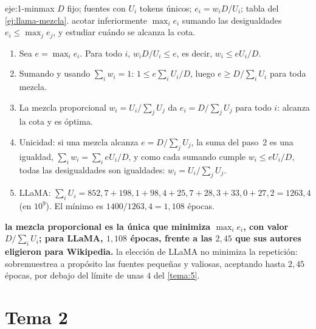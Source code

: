 \begin{solucion}{eje:1-minmax}
\datos $D$ fijo; fuentes con $U_i$ tokens únicos; $e_i=w_iD/U_i$; tabla del \cref{ej:llama-mezcla}.
\planteamiento acotar inferiormente $\max_ie_i$ sumando las desigualdades $e_i\le\max_je_j$, y estudiar cuándo se alcanza la cota.
\pasos
\begin{enumerate}[label=\arabic*.]
  \item Sea $e=\max_ie_i$. Para todo $i$, $w_iD/U_i\le e$, es decir, $w_i\le eU_i/D$.
  \item Sumando y usando $\sum_iw_i=1$: $1\le e\sum_iU_i/D$, luego $e\ge D/\sum_iU_i$ para toda mezcla.
  \item La mezcla proporcional $w_i=U_i/\sum_jU_j$ da $e_i=D/\sum_jU_j$ para todo $i$: alcanza la cota y es óptima.
  \item Unicidad: si una mezcla alcanza $e=D/\sum_jU_j$, la suma del paso~2 es una igualdad, $\sum_iw_i=\sum_ieU_i/D$, y como cada sumando cumple $w_i\le eU_i/D$, todas las desigualdades son igualdades: $w_i=U_i/\sum_jU_j$.
  \item LLaMA: $\sum_iU_i=852{,}7+198{,}1+98{,}4+25{,}7+28{,}3+33{,}0+27{,}2=1263{,}4$ (en $10^{9}$). El mínimo es $1400/1263{,}4=1{,}108$ épocas.
\end{enumerate}
\resultado \textbf{la mezcla proporcional es la única que minimiza $\max_ie_i$, con valor $D/\sum_iU_i$; para LLaMA, $1{,}108$ épocas, frente a las $2{,}45$ que sus autores eligieron para Wikipedia.}
\comprobacion la elección de LLaMA no minimiza la repetición: sobremuestrea a propósito las fuentes pequeñas y valiosas, aceptando hasta $2{,}45$ épocas, por debajo del límite de unas $4$ del \cref{tema:5}.
\end{solucion}

\section{Tema 2}

